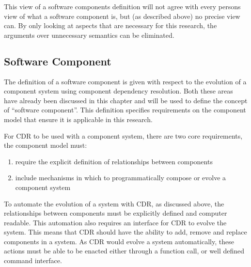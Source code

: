 This view of a software components definition will not agree with every persons view of what a software component is, but (as described above) no precise view can.
By only looking at aspects that are necessary for this research, the arguments over unnecessary semantics can be eliminated. 

\subsection{Software Component}
The definition of a software component is given with respect to the evolution of a component system using component dependency resolution.
Both these areas have already been discussed in this chapter and will be used to define the concept of ``software component''.
This definition specifies requirements on the component model that ensure it is applicable in this research.

For CDR to be used with a component system, there are two core requirements, the component model must:
\begin{enumerate}
  \item require the explicit definition of relationships between components
  \item include mechanisms in which to programmatically compose or evolve a component system
\end{enumerate}
To automate the evolution of a system with CDR, as discussed above, the relationships between components must be explicitly defined and computer readable.
This automation also requires an interface for CDR to evolve the system.
This means that CDR should have the ability to add, remove and replace components in a system.
As CDR would evolve a system automatically, these actions must be able to be enacted either through a function call, or well defined command interface.

